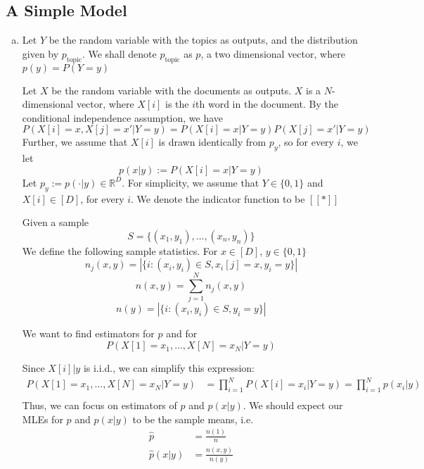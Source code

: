 \documentclass{amsart}
\newcommand{\rr}{\mathbb{R}}    %
\theoremstyle{definition}
\begin{document}
\subsection{A Simple Model}
\begin{enumerate}[(a)]
  	\item 
		Let $Y$ be the random variable with the topics as outputs, and the distribution given by $p_{\mathrm{topic}}$. 
		We shall denote $p_{\mathrm{topic}}$ as $p$, a two dimensional vector, where $p(y) = P(Y = y)$
		
		Let $X$ be the random variable with the documents as outputs.
		$X$ is a $N$-dimensional vector, where $X[i]$ is the $i$th word in the document.
		By the conditional independence assumption, we have 
		\[P(X[i] = x, X[j] = x'|Y = y) = P(X[i] = x|Y=y)P(X[j] = x'|Y = y)\]
		Further, we assume that $X[i]$ is drawn identically from $p_y$, so for every $i$, we let 
		\[p(x|y) := P(X[i] = x| Y= y)\]
		Let $p_y := p(\cdot | y) \in \rr^D$. For simplicity, we assume that $Y \in \{0,1\}$ and $X[i] \in [D]$, for every $i$. 
		We denote the indicator function to be $[[\ast]]$

		Given a sample
		\[
		S = \{(x_1,y_1), \ldots, (x_n, y_n)\}
		\]
		We define the following sample statistics. For $x \in [D]$, $y \in \{0,1\}$
		\[n_j(x, y) = |\{i : (x_i, y_i)\in S, x_i[j] = x, y_i = y\}|\]
		\[n(x,y) = \sum_{j = 1}^{N} n_j(x,y)\]
		\[n(y) = |\{i : (x_i, y_i)\in S, y_i = y\}|\]

		We want to find estimators for $p$ and for  
		\[P(X[1] = x_1, \ldots, X[N] = x_N | Y = y)\]

		Since $X[i] | y$ is i.i.d., we can simplify this expression:
		\begin{align*}
			P(X[1] = x_1, \ldots, X[N] = x_N | Y = y) &= \prod_{i=1}^N P(X[i] = x_i | Y = y) = \prod_{i = 1}^{N}p(x_i|y)\\
		\end{align*}
		Thus, we can focus on estimators of $p$ and $p(x|y)$.
		We should expect our MLEs for $p$ and $p(x|y)$ to be the sample means, i.e. 
		\begin{align*}
		\hat{p} &= \frac{n(1)}{n}\\
		\hat{p}(x|y) &= \frac{n(x,y)}{n(y)}
		\end{align*}
		

\end{enumerate}
\end{document}

